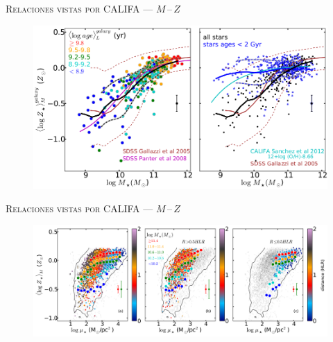 \documentclass[xcolor=dvipsnames,4pt,hyperref={colorlinks,citecolor=black,linkcolor=black,urlcolor=black}]{beamer}
\begin{document}
\begin{frame}{\textsc{Relaciones vistas por CALIFA --- $M\,$--$\,Z$}}

\begin{figure}
\includegraphics[scale=1]{img/gonzalez2014b-1}
\end{figure}
\end{frame}

\begin{frame}{\textsc{Relaciones vistas por CALIFA --- $M\,$--$\,Z$}}

\begin{figure}
\includegraphics[scale=1]{img/gonzalez2014b-3}
\end{figure}
\end{frame}
\end{document}
